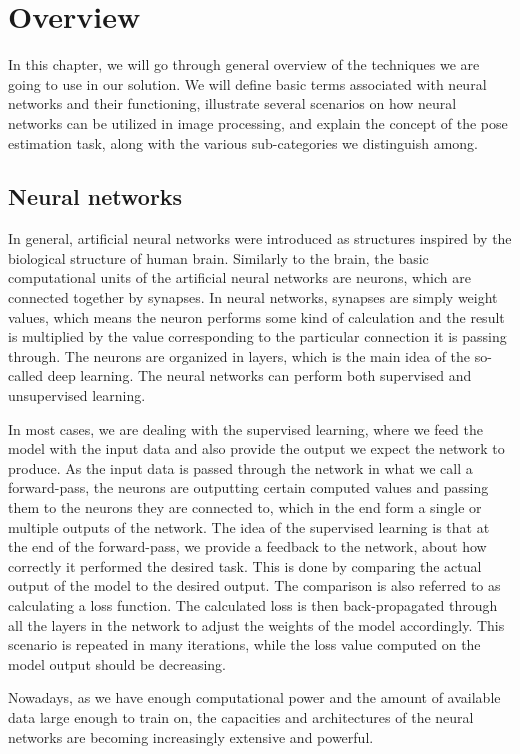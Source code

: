 \chapter{Overview}\label{chap:overview}

In this chapter, we will go through general overview of the techniques we are going to use in our solution. We will define basic terms associated with neural networks and their functioning, illustrate several scenarios on how neural networks can be utilized in image processing, and explain the concept of the pose estimation task, along with the various sub-categories we distinguish among.

\section{Neural networks}
  
In general, artificial neural networks were introduced as structures inspired by the biological structure of human brain. Similarly to the brain, the basic computational units of the artificial neural networks are neurons, which are connected together by synapses. In neural networks, synapses are simply weight values, which means the neuron performs some kind of calculation and the result is multiplied by the value corresponding to the particular connection it is passing through. The neurons are organized in layers, which is the main idea of the so-called deep learning. The neural networks can perform both supervised and unsupervised learning.\par
\vspace{5mm}
\noindent In most cases, we are dealing with the supervised learning, where we feed the model with the input data and also provide the output we expect the network to produce. As the input data is passed through the network in what we call a forward-pass, the neurons are outputting certain computed values and passing them to the neurons they are connected to, which in the end form a single or multiple outputs of the network. The idea of the supervised learning is that at the end of the forward-pass, we provide a feedback to the network, about how correctly it performed the desired task. This is done by comparing the actual output of the model to the desired output. The comparison is also referred to as calculating a loss function. The calculated loss is then back-propagated through all the layers in the network to adjust the weights of the model accordingly. This scenario is repeated in many iterations, while the loss value computed on the model output should be decreasing.\par
\vspace{5mm}
\noindent
Nowadays, as we have enough computational power and the amount of available data large enough to train on, the capacities and architectures of the neural networks are becoming increasingly extensive and powerful. 


